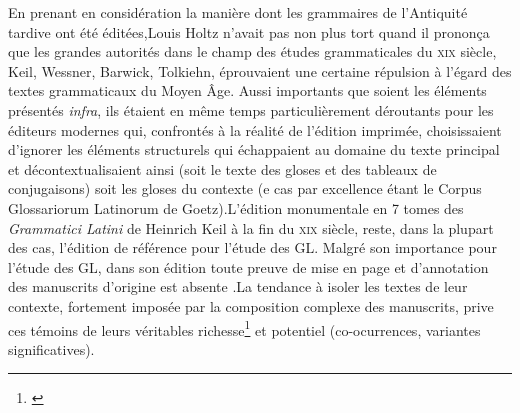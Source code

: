 \documentclass[a4paper, twoside, 12pt]{book}
\begin{document}
En prenant en considération la manière dont les grammaires de l'Antiquité tardive ont été éditées,Louis Holtz n'avait pas non plus tort quand il prononça que les grandes autorités dans le champ des études grammaticales du \textsc{xix}\ieme{} siècle, Keil, Wessner, Barwick, Tolkiehn, éprouvaient  une certaine répulsion à l'égard des textes grammaticaux du Moyen Âge. Aussi importants que soient les éléments présentés \textit{infra}, ils étaient en même temps particulièrement déroutants pour les éditeurs modernes qui, confrontés à la réalité de l'édition imprimée, choisissaient d'ignorer les éléments structurels qui échappaient au domaine du texte principal et décontextualisaient ainsi (soit le texte des gloses et des tableaux de conjugaisons) soit les gloses du contexte (e cas par excellence étant le Corpus Glossariorum Latinorum de Goetz).L’édition monumentale en 7 tomes des \textit{Grammatici Latini} de Heinrich Keil à la fin du \textsc{xix}\ieme{} siècle, reste, dans la plupart des cas, l’édition de référence  pour l’étude des GL. Malgré son importance pour l'étude des GL, dans  son édition toute preuve de mise en page et d’annotation des manuscrits d’origine est absente .La tendance à isoler les textes de leur contexte, fortement imposée par la composition complexe des manuscrits, prive ces témoins de leurs véritables richesse\footnote{\cite{pierazzo2011putting}} et potentiel (co-ocurrences, variantes significatives).\\
\end{document}
